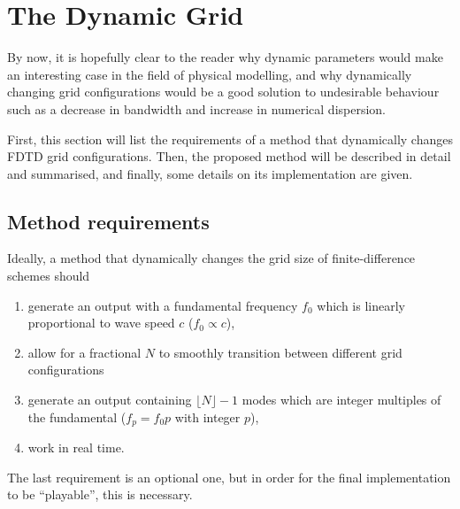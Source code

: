 \section{The Dynamic Grid}
By now, it is hopefully clear to the reader why dynamic parameters would make an interesting case in the field of physical modelling, and why dynamically changing grid configurations would be a good solution to undesirable behaviour such as a decrease in bandwidth and increase in numerical dispersion. %

First, this section will list the requirements of a method that dynamically changes FDTD grid configurations. %
Then, the proposed method will be described in detail and summarised, and finally, some details on its implementation are given. 

\subsection{Method requirements}\label{sec:methodReq}
Ideally, a method that dynamically changes the grid size of finite-difference schemes should
\begin{enumerate}
    \item generate an output with a fundamental frequency $f_0$ %
    which is linearly proportional to wave speed $c$ ($f_0 \propto c$),
    \item allow for a fractional $N$ to smoothly transition between different grid configurations%
    \item generate an output containing $\lfloor N\rfloor-1$ modes which are integer multiples of the fundamental ($f_p = f_0 p$ with integer $p$),
    \item work in real time.
\end{enumerate}
The last requirement is an optional one, but in order for the final implementation to be ``playable'', this is necessary. 
%


